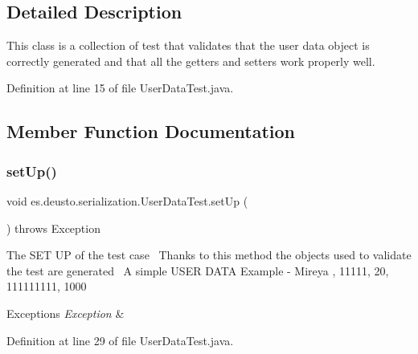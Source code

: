\subsection{Detailed Description}
This class is a collection of test that validates that the user data object is correctly generated and that all the getters and setters work properly well. 

Definition at line 15 of file User\+Data\+Test.\+java.



\subsection{Member Function Documentation}
\mbox{\label{classes_1_1deusto_1_1serialization_1_1_user_data_test_a516d13b55d42b812fec8228334afbcaf}} 
\subsubsection{\texorpdfstring{set\+Up()}{setUp()}}
{\footnotesize\ttfamily void es.\+deusto.\+serialization.\+User\+Data\+Test.\+set\+Up (\begin{DoxyParamCaption}{ }\end{DoxyParamCaption}) throws Exception}

The S\+ET UP of the test case~\newline
Thanks to this method the objects used to validate the test are generated~\newline
A simple U\+S\+ER D\+A\+TA Example -\/ Mireya , 11111, 20, 111111111, 1000


\begin{DoxyExceptions}{Exceptions}
{\em Exception} & \\
\hline
\end{DoxyExceptions}


Definition at line 29 of file User\+Data\+Test.\+java.

\mbox{\label{classes_1_1deusto_1_1serialization_1_1_user_data_test_a28ec7d8b20979ac4728275517ffb44f2}} 
